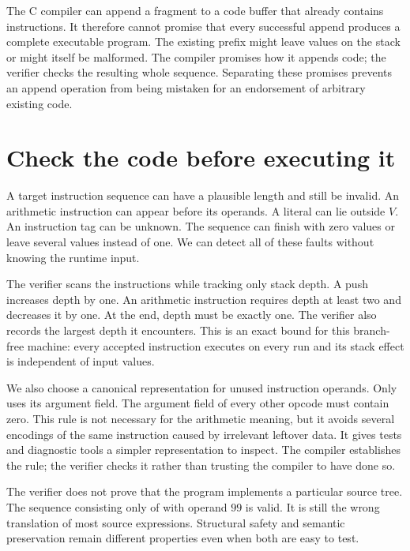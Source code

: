 The C compiler can append a fragment to a code buffer that already contains instructions.
It therefore cannot promise that every successful append produces a complete executable program.
The existing prefix might leave values on the stack or might itself be malformed.
The compiler promises how it appends code; the verifier checks the resulting whole sequence.
Separating these promises prevents an append operation from being mistaken for an endorsement of arbitrary existing code.

\section{Check the code before executing it}
\label{sec:tiny-stack-verifier}

A target instruction sequence can have a plausible length and still be invalid.
An arithmetic instruction can appear before its operands.
A literal can lie outside $V$.
An instruction tag can be unknown.
The sequence can finish with zero values or leave several values instead of one.
We can detect all of these faults without knowing the runtime input.

The verifier scans the instructions while tracking only stack depth.
A push increases depth by one.
An arithmetic instruction requires depth at least two and decreases it by one.
At the end, depth must be exactly one.
The verifier also records the largest depth it encounters.
This is an exact bound for this branch-free machine: every accepted instruction executes on every run and its stack effect is independent of input values.

We also choose a canonical representation for unused instruction operands.
Only  uses its argument field.
The argument field of every other opcode must contain zero.
This rule is not necessary for the arithmetic meaning, but it avoids several encodings of the same instruction caused by irrelevant leftover data.
It gives tests and diagnostic tools a simpler representation to inspect.
The compiler establishes the rule; the verifier checks it rather than trusting the compiler to have done so.

The verifier does not prove that the program implements a particular source tree.
The sequence consisting only of  with operand $99$ is valid.
It is still the wrong translation of most source expressions.
Structural safety and semantic preservation remain different properties even when both are easy to test.

